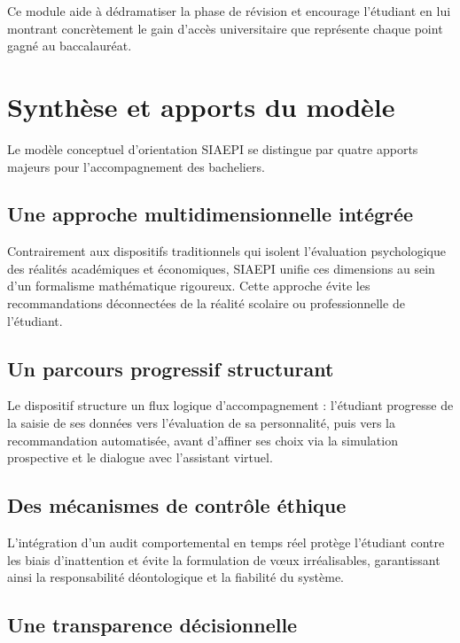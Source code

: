 Ce module aide à dédramatiser la phase de révision et encourage l'étudiant en lui montrant concrètement le gain d'accès universitaire que représente chaque point gagné au baccalauréat.

\section{Synthèse et apports du modèle}
\label{sec:synthese}

Le modèle conceptuel d'orientation SIAEPI se distingue par quatre apports majeurs pour l'accompagnement des bacheliers.

\subsection{Une approche multidimensionnelle intégrée}

Contrairement aux dispositifs traditionnels qui isolent l'évaluation psychologique des réalités académiques et économiques, SIAEPI unifie ces dimensions au sein d'un formalisme mathématique rigoureux. Cette approche évite les recommandations déconnectées de la réalité scolaire ou professionnelle de l'étudiant.

\subsection{Un parcours progressif structurant}

Le dispositif structure un flux logique d'accompagnement : l'étudiant progresse de la saisie de ses données vers l'évaluation de sa personnalité, puis vers la recommandation automatisée, avant d'affiner ses choix via la simulation prospective et le dialogue avec l'assistant virtuel.

\subsection{Des mécanismes de contrôle éthique}

L'intégration d'un audit comportemental en temps réel protège l'étudiant contre les biais d'inattention et évite la formulation de vœux irréalisables, garantissant ainsi la responsabilité déontologique et la fiabilité du système.

\subsection{Une transparence décisionnelle}

